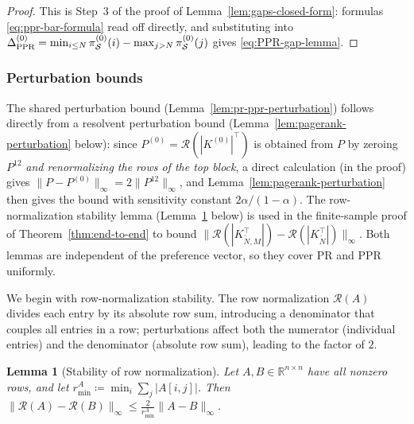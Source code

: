 \documentclass{article}
\theoremstyle{plain}
\newtheorem{lemma}[theorem]{Lemma}
\theoremstyle{definition}
\def\R{\mathbb{R}}
\def\tp{\intercal}
\newcommand{\arXivtag}[1][]{#1}
\begin{document}
\begin{proof}%
	This is Step~3 of the proof of Lemma~\ref{lem:gaps-closed-form}: formulas \eqref{eq:ppr-bar-formula} read off directly, and substituting into $\Delta^{(0)}_{\textnormal{PPR}} = \min_{i \leq N}\pi_{\mathcal{S}}^{(0)}(i) - \max_{j > N}\pi_{\mathcal{S}}^{(0)}(j)$ gives \eqref{eq:PPR-gap-lemma}.
\end{proof}


\subsubsection{Perturbation bounds}\label{sec:proofs-perturbation}

The shared perturbation bound (Lemma~\ref{lem:pr-ppr-perturbation}) follows directly from a resolvent perturbation bound (Lemma~\ref{lem:pagerank-perturbation} below): since $P^{(0)} = \mathcal{R}(|K^{(0)}|^\tp)$ is obtained from $P$ by zeroing $P^{12}$ \emph{and renormalizing \arXivtag[the rows of the top block]}, a direct calculation (in the proof) gives $\|P - P^{(0)}\|_\infty = 2\|P^{12}\|_\infty$, and Lemma~\ref{lem:pagerank-perturbation} then gives the bound with sensitivity constant $2\alpha/(1-\alpha)$. The row-normalization stability lemma (Lemma~\ref{lem:row-norm-perturbation} below) is used in the finite-sample proof of Theorem~\ref{thm:end-to-end} to bound $\|\mathcal{R}(|K_{\tilde{N},M}^\tp|) - \mathcal{R}(|K_{\tilde{N}}^\tp|)\|_\infty$. Both lemmas are independent of the preference vector, so they cover PR and PPR uniformly.

We begin with row-normalization stability. The row normalization $\mathcal{R}(A)$ divides each entry by its absolute row sum, introducing a denominator that couples all entries in a row; perturbations affect both the numerator (individual entries) and the denominator (absolute row sum), leading to the factor of $2$.

\begin{lemma}[Stability of row normalization]\label{lem:row-norm-perturbation}
	Let $A, B \in \R^{n \times n}$ have all nonzero rows, and let $r^A_{\min} \coloneqq \min_i \sum_j |A[i,j]|$. Then
	$\|\mathcal{R}(A) - \mathcal{R}(B)\|_\infty \leq \frac{2}{r^A_{\min}} \|A - B\|_\infty$.
\end{lemma}
\end{document}
